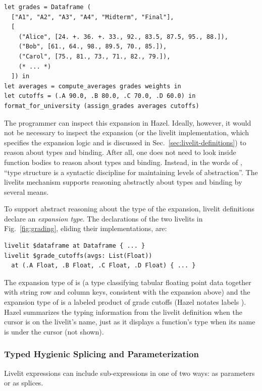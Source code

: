 \begin{lstlisting}
let grades = Dataframe (
  ["A1", "A2", "A3", "A4", "Midterm", "Final"],
  [
    ("Alice", [24. +. 36. +. 33., 92., 83.5, 87.5, 95., 88.]),
    ("Bob", [61., 64., 98., 89.5, 70., 85.]),
    ("Carol", [75., 81., 73., 71., 82., 79.]),
    (* ... *)
  ]) in
let averages = compute_averages grades weights in
let cutoffs = (.A 90.0, .B 80.0, .C 70.0, .D 60.0) in
format_for_university (assign_grades averages cutoffs)
\end{lstlisting}

The programmer can inspect this expansion in Hazel.
Ideally, however, it would not be necessary to inspect the expansion
(or the livelit implementation, which specifies the expansion logic and is discussed in Sec.~\ref{sec:livelit-definitions})
to reason about types and binding.
After all, one does not need to look inside
function bodies to reason about types and binding.
Instead, in the words of \citet{DBLP:conf/ifip/Reynolds83},
``type structure is a syntactic discipline for maintaining levels of abstraction''.
The livelits mechanism supports reasoning abstractly about types and binding by
several means.

To support abstract reasoning about the type of the expansion,
livelit definitions declare an \emph{expansion type}.
The declarations of the two livelits in Fig.~\ref{fig:grading},
eliding their implementations, are:
\begin{lstlisting}[numbers=none]
livelit $dataframe at Dataframe { ... }
livelit $grade_cutoffs(avgs: List(Float))
  at (.A Float, .B Float, .C Float, .D Float) { ... }
\end{lstlisting}
The expansion type of  is 
(a type classifying tabular floating point data together with string row and column keys, consistent with the expansion above)
and the expansion type of  is a labeled product of grade cutoffs (Hazel notates labels ).
Hazel summarizes the typing information from the livelit definition when the cursor is on the livelit's name,
just as it displays a function's type when its name is under the cursor (not shown).

\subsubsection{Typed Hygienic Splicing and Parameterization}\label{sec:splicing-and-parameterization}
Livelit expressions can include sub-expressions in one of two ways:
as parameters or as splices.

